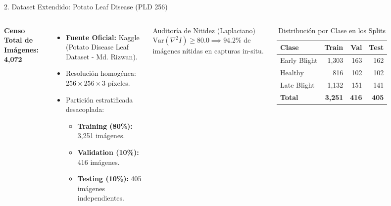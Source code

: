 \documentclass[aspectratio=169,10pt]{beamer}
\begin{document}
\begin{frame}{2. Dataset Extendido: Potato Leaf Disease (PLD 256)}
    \begin{columns}
        \textbf{Censo Total de Imágenes: 4,072}
        \begin{itemize}
            \item \textbf{Fuente Oficial:} Kaggle (Potato Disease Leaf Dataset - Md. Rizwan).
            \item Resolución homogénea: $256 \times 256 \times 3$ píxeles.
            \item Partición estratificada desacoplada:
            \begin{itemize}
                \item \textbf{Training (80\%):} 3,251 imágenes.
                \item \textbf{Validation (10\%):} 416 imágenes.
                \item \textbf{Testing (10\%):} 405 imágenes independientes.
            \end{itemize}
        \end{itemize}
        
        \vspace{0.2cm}
        \begin{block}{Auditoría de Nitidez (Laplaciano)}
            $\text{Var}(\nabla^2 I) \ge 80.0 \implies 94.2\%$ de imágenes nítidas en capturas in-situ.
        \end{block}

        \begin{table}
        \centering
        \caption{Distribución por Clase en los Splits}
        \footnotesize
        \begin{tabular}{lrrr}
            \toprule
            \textbf{Clase} & \textbf{Train} & \textbf{Val} & \textbf{Test} \\
            \midrule
            Early Blight & 1,303 & 163 & 162 \\
            Healthy & 816 & 102 & 102 \\
            Late Blight & 1,132 & 151 & 141 \\
            \midrule
            \textbf{Total} & \textbf{3,251} & \textbf{416} & \textbf{405} \\
            \bottomrule
        \end{tabular}
        \end{table}
    \end{columns}
\end{frame}
\end{document}
